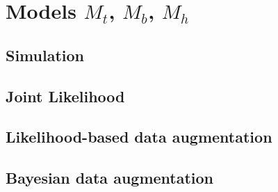 \documentclass[color=usenames,dvipsnames]{beamer}\usepackage[]{graphicx}\usepackage[]{color}
\begin{document}









\section{Models $M_t$, $M_b$, $M_h$}


\subsection{Simulation}


\subsection{Joint Likelihood}

\subsection{Likelihood-based data augmentation}


\subsection{Bayesian data augmentation}





\end{document}
